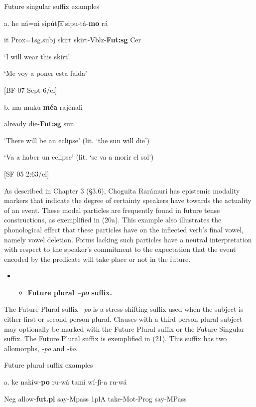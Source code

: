    Future singular suffix examples   

a.    he   ná=ni     sipútʃ͡a   sipu-tá-\textbf{mo}     rá

it  Prox=1sg.subj  skirt  skirt-Vblz-\textbf{Fut:sg}  Cer

‘I will wear this skirt’

‘Me voy a poner esta falda’        

[BF 07 Sept 6/el]

b.   ma     muku-\textbf{méa}   rajénali

already   die-\textbf{Fut:sg}   sun

‘There will be an eclipse’ (lit. ‘the sun will die’)

‘Va a haber un eclipse’ (lit. ‘se va a morir el sol’)  

[SF 05 2:63/el]


As described in Chapter 3 (§3.6), Choguita Rarámuri has epistemic modality markers that indicate the degree of certainty speakers have towards the actuality of an event. These modal particles are frequently found in future tense constructions, as exemplified in (20a). This example also illustrates the phonological effect that these particles have on the inflected verb’s final vowel, namely vowel deletion. Forms lacking such particles have a neutral interpretation with respect to the speaker’s commitment to the expectation that the event encoded by the predicate will take place or not in the future.


\begin{itemize}
\item \begin{itemize}
\item \textbf{Future plural \textit{–po} }\textbf{suffix.}
\end{itemize}
\end{itemize}

The Future Plural suffix \textit{–po} is a stress-shifting suffix used when the subject is either first or second person plural. Clauses with a third person plural subject may optionally be marked with the Future Plural suffix or the Future Singular suffix. The Future Plural suffix is exemplified in (21). This suffix has two allomorphs, \textit{{}-po} and \textit{{}-bo}.


   Future plural suffix examples

a.   ke   nakíw-\textbf{po}   ru-wá     tamí   wí-ʃi-a   ru-wá

    Neg   allow-\textbf{fut.pl}   say-Mpass   1plA   take-Mot-Prog say-MPass

